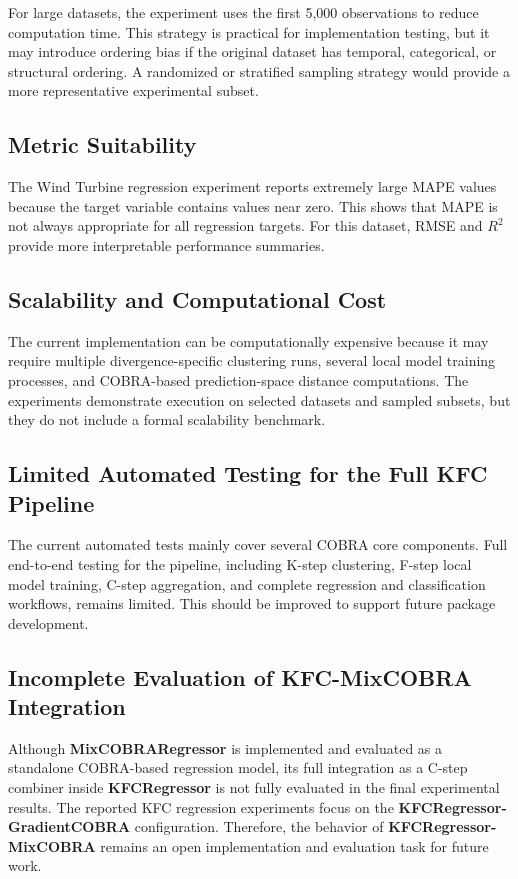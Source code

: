 \hs For large datasets, the experiment uses the first 5,000 observations to reduce computation time. This strategy is practical for implementation testing, but it may introduce ordering bias if the original dataset has temporal, categorical, or structural ordering. A randomized or stratified sampling strategy would provide a more representative experimental subset.

\subsection{Metric Suitability}

\hs The Wind Turbine regression experiment reports extremely large MAPE values because the target variable contains values near zero. This shows that MAPE is not always appropriate for all regression targets. For this dataset, RMSE and $R^2$ provide more interpretable performance summaries.

\subsection{Scalability and Computational Cost}

\hs The current implementation can be computationally expensive because it may require multiple divergence-specific clustering runs, several local model training processes, and COBRA-based prediction-space distance computations. The experiments demonstrate execution on selected datasets and sampled subsets, but they do not include a formal scalability benchmark.

\subsection{Limited Automated Testing for the Full KFC Pipeline}

\hs The current automated tests mainly cover several COBRA core components. Full end-to-end testing for the \KFCProcedure{} pipeline, including K-step clustering, F-step local model training, C-step aggregation, and complete regression and classification workflows, remains limited. This should be improved to support future package development.

\subsection{Incomplete Evaluation of KFC-MixCOBRA Integration}

\hs Although \textbf{MixCOBRARegressor} is implemented and evaluated as a standalone COBRA-based regression model, its full integration as a C-step combiner inside \textbf{KFCRegressor} is not fully evaluated in the final experimental results. The reported KFC regression experiments focus on the \textbf{KFCRegressor-GradientCOBRA} configuration. Therefore, the behavior of \textbf{KFCRegressor-MixCOBRA} remains an open implementation and evaluation task for future work.

